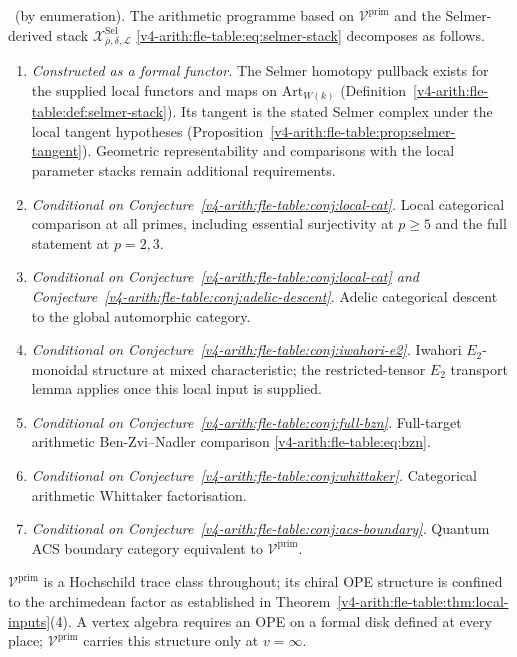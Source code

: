 \begin{theorem}
\label{v4-arith:fle-table:thm:summary}
\ClaimStatusProvedHere\ (by enumeration).
The arithmetic programme based on
\(\mathcal{V}^{\mathrm{prim}}\) and the Selmer-derived stack
\(\mathcal{X}^{\mathrm{Sel}}_{\bar\rho,\delta,\mathcal{L}}\)
\eqref{v4-arith:fle-table:eq:selmer-stack} decomposes as follows.
\begin{enumerate}
\item \emph{Constructed as a formal functor.} The Selmer homotopy
  pullback exists for the supplied local functors and maps on
  \(\mathrm{Art}_{W(k)}\)
  (Definition~\ref{v4-arith:fle-table:def:selmer-stack}). Its tangent
  is the stated Selmer complex under the local tangent hypotheses
  (Proposition~\ref{v4-arith:fle-table:prop:selmer-tangent}).
  Geometric representability and comparisons with the local parameter
  stacks remain additional requirements.

\item \emph{Conditional on
  Conjecture~\ref{v4-arith:fle-table:conj:local-cat}.}
  Local categorical comparison at all primes, including essential
  surjectivity at \(p \geq 5\) and the full statement at \(p = 2, 3\).

\item \emph{Conditional on
  Conjecture~\ref{v4-arith:fle-table:conj:local-cat} and
  Conjecture~\ref{v4-arith:fle-table:conj:adelic-descent}.}
  Adelic categorical descent to the global automorphic category.

\item \emph{Conditional on
  Conjecture~\ref{v4-arith:fle-table:conj:iwahori-e2}.}
  Iwahori \(E_{2}\)-monoidal structure at mixed characteristic;
  the restricted-tensor \(E_{2}\) transport lemma applies once this
  local input is supplied.

\item \emph{Conditional on
  Conjecture~\ref{v4-arith:fle-table:conj:full-bzn}.}
  Full-target arithmetic Ben-Zvi--Nadler comparison
  \eqref{v4-arith:fle-table:eq:bzn}.

\item \emph{Conditional on
  Conjecture~\ref{v4-arith:fle-table:conj:whittaker}.}
  Categorical arithmetic Whittaker factorisation.

\item \emph{Conditional on
  Conjecture~\ref{v4-arith:fle-table:conj:acs-boundary}.}
  Quantum ACS boundary category equivalent to
  \(\mathcal{V}^{\mathrm{prim}}\).
\end{enumerate}
\(\mathcal{V}^{\mathrm{prim}}\) is a Hochschild trace class throughout;
its chiral OPE structure is confined to the archimedean factor
as established in Theorem~\ref{v4-arith:fle-table:thm:local-inputs}(4).
A vertex algebra requires an OPE on a formal disk defined at every
place; \(\mathcal{V}^{\mathrm{prim}}\) carries this structure only at
\(v = \infty\).
\end{theorem}
